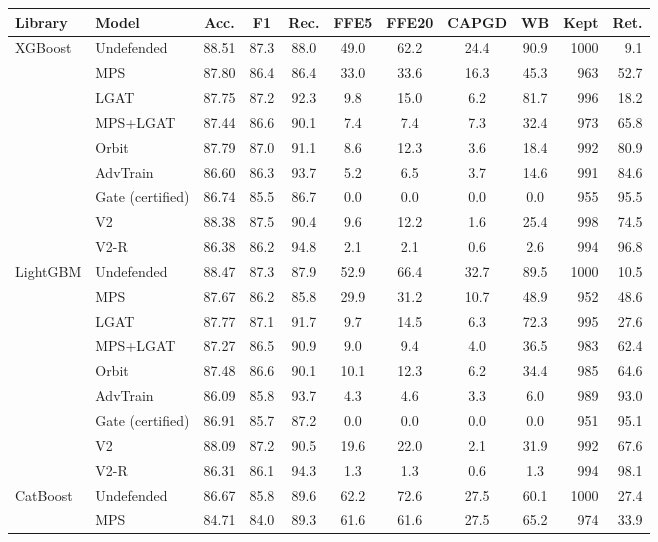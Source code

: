 \begin{tabular}{@{}llcccccccrr@{}}
\toprule
\textbf{Library} & \textbf{Model} & \textbf{Acc.} & \textbf{F1} & \textbf{Rec.} & \textbf{FFE5} & \textbf{FFE20} & \textbf{CAPGD} & \textbf{WB} & \textbf{Kept} & \textbf{Ret.} \\
\midrule
XGBoost & Undefended & 88.51 & 87.3 & 88.0 & 49.0 & 62.2 & 24.4 & 90.9 & 1000 & 9.1 \\
 & MPS & 87.80 & 86.4 & 86.4 & 33.0 & 33.6 & 16.3 & 45.3 & 963 & 52.7 \\
 & LGAT & 87.75 & 87.2 & 92.3 & 9.8 & 15.0 & 6.2 & 81.7 & 996 & 18.2 \\
 & MPS+LGAT & 87.44 & 86.6 & 90.1 & 7.4 & 7.4 & 7.3 & 32.4 & 973 & 65.8 \\
 & Orbit & 87.79 & 87.0 & 91.1 & 8.6 & 12.3 & 3.6 & 18.4 & 992 & 80.9 \\
 & AdvTrain & 86.60 & 86.3 & 93.7 & 5.2 & 6.5 & 3.7 & 14.6 & 991 & 84.6 \\
 & Gate (certified) & 86.74 & 85.5 & 86.7 & 0.0 & 0.0 & 0.0 & 0.0 & 955 & 95.5 \\
 & V2 & 88.38 & 87.5 & 90.4 & 9.6 & 12.2 & 1.6 & 25.4 & 998 & 74.5 \\
 & V2-R & 86.38 & 86.2 & 94.8 & 2.1 & 2.1 & 0.6 & 2.6 & 994 & 96.8 \\
\midrule
LightGBM & Undefended & 88.47 & 87.3 & 87.9 & 52.9 & 66.4 & 32.7 & 89.5 & 1000 & 10.5 \\
 & MPS & 87.67 & 86.2 & 85.8 & 29.9 & 31.2 & 10.7 & 48.9 & 952 & 48.6 \\
 & LGAT & 87.77 & 87.1 & 91.7 & 9.7 & 14.5 & 6.3 & 72.3 & 995 & 27.6 \\
 & MPS+LGAT & 87.27 & 86.5 & 90.9 & 9.0 & 9.4 & 4.0 & 36.5 & 983 & 62.4 \\
 & Orbit & 87.48 & 86.6 & 90.1 & 10.1 & 12.3 & 6.2 & 34.4 & 985 & 64.6 \\
 & AdvTrain & 86.09 & 85.8 & 93.7 & 4.3 & 4.6 & 3.3 & 6.0 & 989 & 93.0 \\
 & Gate (certified) & 86.91 & 85.7 & 87.2 & 0.0 & 0.0 & 0.0 & 0.0 & 951 & 95.1 \\
 & V2 & 88.09 & 87.2 & 90.5 & 19.6 & 22.0 & 2.1 & 31.9 & 992 & 67.6 \\
 & V2-R & 86.31 & 86.1 & 94.3 & 1.3 & 1.3 & 0.6 & 1.3 & 994 & 98.1 \\
\midrule
CatBoost & Undefended & 86.67 & 85.8 & 89.6 & 62.2 & 72.6 & 27.5 & 60.1 & 1000 & 27.4 \\
 & MPS & 84.71 & 84.0 & 89.3 & 61.6 & 61.6 & 27.5 & 65.2 & 974 & 33.9 \\

\end{tabular}
